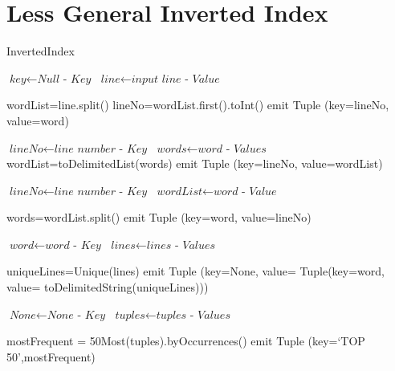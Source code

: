 \documentclass[journal,10pt]{IEEEtran}
\begin{document}
\section*{Less General Inverted Index}

\begin{algorithm}
\caption{InvertedIndex}\label{euclid}
\begin{algorithmic}[1]





\State $\textit{key} \gets \textit{Null - Key} $
\State $\textit{line} \gets \textit{input line - Value }$



\State wordList=line.split()
\State lineNo=wordList.first().toInt()
\State emit Tuple (key=lineNo, value=word)
\EndIf
\EndFor
\EndProcedure


\State $\textit{lineNo} \gets \textit{line number - Key} $
\State $\textit{words} \gets \textit{word - Values}$
\State wordList=toDelimitedList(words)
\State emit Tuple (key=lineNo, value=wordList)
\EndProcedure

\State $\textit{lineNo} \gets \textit{line number - Key} $
\State $\textit{wordList} \gets \textit{word - Value}$

\State words=wordList.split()
\State emit Tuple (key=word, value=lineNo)
\EndFor
\EndProcedure


\State $\textit{word} \gets \textit{word - Key} $
\State $\textit{lines} \gets \textit{lines - Values}$

\State uniqueLines=Unique(lines)
\State emit Tuple (key=None, value= Tuple(key=word, value= toDelimitedString(uniqueLines)))

\EndProcedure


\State $\textit{None} \gets \textit{None - Key} $
\State $\textit{tuples} \gets \textit{tuples - Values}$

\State mostFrequent = 50Most(tuples).byOccurrences()
\State emit Tuple (key=`TOP 50',mostFrequent)

\EndProcedure

\end{algorithmic}
\end{algorithm}


\clearpage
\end{document}
